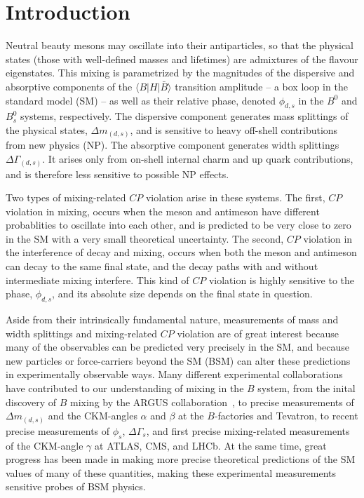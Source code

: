 \section{Introduction}
Neutral beauty mesons may oscillate into their antiparticles, so that the 
physical states (those with well-defined masses and lifetimes) are admixtures of the flavour eigenstates. This mixing is parametrized by the magnitudes 
of the dispersive and absorptive components of the $\langle B | H |\bar{B}\rangle$ transition amplitude -- a box loop in the standard model (SM) -- as well as their relative phase, denoted $\phi_{d,s}$ in the $B^0$ and $B^0_s$ systems, respectively. The dispersive component generates mass splittings of the physical states, $\Delta m_{(d,s)}$, and is sensitive to heavy off-shell contributions from new physics (NP). The absorptive component generates width splittings $\Delta\Gamma_{(d,s)}$. It arises only from on-shell internal charm and up quark contributions, and is therefore less sensitive to possible NP effects.


Two types of mixing-related $CP$ violation arise in these systems. The first, $CP$ violation in mixing, occurs when the meson and antimeson have different
probablities to oscillate into each other, and is predicted to be very close to zero in the SM with a very
small theoretical uncertainty. The second, $CP$ violation in the interference of decay and mixing, occurs when both the meson
and antimeson can decay to the same final state, and the decay paths with and without intermediate mixing interfere. This kind of $CP$
violation is highly sensitive to the phase, $\phi_{d,s}$, and its absolute size depends on the final state in question.

Aside from their intrinsically fundamental nature, measurements of mass and width splittings and mixing-related $CP$ violation are
of great interest because many of the observables can be predicted very precisely in the SM, and because new particles or force-carriers
beyond the SM (BSM) can alter these predictions in experimentally observable ways. Many different experimental collaborations have contributed
to our understanding of mixing in the $B$ system, from the inital discovery of $B$ mixing by the ARGUS collaboration~\cite{Prentice:1987ap}, to precise measurements
of $\Delta m_{(d,s)}$ and the CKM-angles $\alpha$ and $\beta$ at the $B$-factories and Tevatron, to recent precise measurements
of $\phi_s$, $\Delta\Gamma_s$, and first precise mixing-related measurements of the CKM-angle $\gamma$ at ATLAS, CMS, and LHCb. At the same
time, great progress has been made in making more precise theoretical predictions of the SM values of many of these quantities, making
these experimental measurements sensitive probes of BSM physics.

